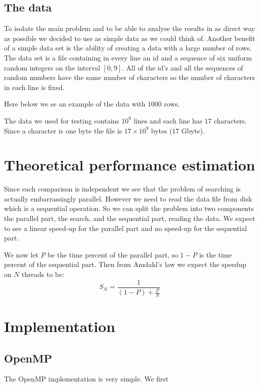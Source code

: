 \documentclass[a4paper,10pt]{article}
\begin{document}
\subsection{The data}
To isolate the main problem and to be able to analyse the results in as direct way as possible we decided to use as simple data as we could think of.
Another benefit of a simple data set is the ability of creating a data with a large number of rows. 
The data set is a file containing in every line an id and a sequence of six uniform random integers on the interval $[0,9]$.  
All of the id's and all the sequences of random numbers have the same number of characters so the number of characters in each line is fixed.

Here below we se an example of the data with $1000$ rows.
  
The data we used for testing contains $10^{9}$ lines and each line has $17$ characters.  Since a character is one byte
the file is $17 \times 10^9$ bytes ($17$ Gbyte).

\section{Theoretical performance estimation}

Since each comparison is independent we see that the problem of searching is actually 
embarrassingly parallel.  
However we need to read the data file from disk which is a sequential operation.  
So we can split the problem into two components the parallel part, the search,
and the sequential part, reading the data.
We expect to see a linear speed-up for the parallel part and
no speed-up for the sequential part.

We now let $P$ be the time percent of the parallel  
part, so $1-P$ is the time percent of the sequential part.  
Then from Amdahl's law we expect the speedup on $N$ threads to be:
$$ S_N = \frac{1}{(1-P)+\frac{P}{N}}$$

\section{Implementation}
  
\subsection{OpenMP}

  The OpenMP implementation is very simple.
  We first  
\end{document}

